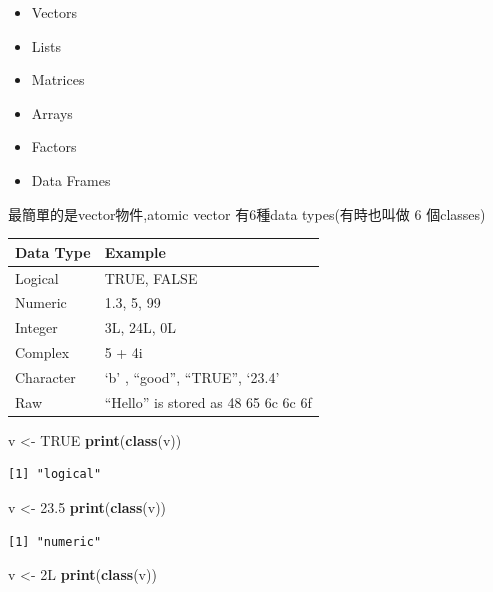 \documentclass[]{book}
\newenvironment{Shaded}{\begin{snugshade}}{\end{snugshade}}
\newcommand{\FloatTok}[1]{\textcolor[rgb]{0.00,0.00,0.81}{#1}}
\newcommand{\KeywordTok}[1]{\textcolor[rgb]{0.13,0.29,0.53}{\textbf{#1}}}
\newcommand{\NormalTok}[1]{#1}
\newcommand{\OtherTok}[1]{\textcolor[rgb]{0.56,0.35,0.01}{#1}}
\newcommand{\StringTok}[1]{\textcolor[rgb]{0.31,0.60,0.02}{#1}}
\providecommand{\tightlist}{%
  \setlength{\itemsep}{0pt}\setlength{\parskip}{0pt}}
\theoremstyle{definition}
\theoremstyle{definition}
\theoremstyle{definition}
\theoremstyle{remark}
\begin{document}
\begin{itemize}
\tightlist
\item
  Vectors\\
\item
  Lists\\
\item
  Matrices
\item
  Arrays
\item
  Factors
\item
  Data Frames
\end{itemize}

最簡單的是vector物件,atomic vector 有6種data types(有時也叫做 6
個classes)

\begin{longtable}[]{@{}ll@{}}
\toprule
Data Type & Example\tabularnewline
\midrule
\endhead
Logical & TRUE, FALSE\tabularnewline
Numeric & 1.3, 5, 99\tabularnewline
Integer & 3L, 24L, 0L\tabularnewline
Complex & 5 + 4i\tabularnewline
Character & `b' , ``good'', ``TRUE'', `23.4'\tabularnewline
Raw & ``Hello'' is stored as 48 65 6c 6c 6f\tabularnewline
\bottomrule
\end{longtable}

\begin{Shaded}
\begin{Highlighting}[]
\NormalTok{v <-}\StringTok{ }\OtherTok{TRUE} 
\KeywordTok{print}\NormalTok{(}\KeywordTok{class}\NormalTok{(v))}
\end{Highlighting}
\end{Shaded}

\begin{verbatim}
[1] "logical"
\end{verbatim}

\begin{Shaded}
\begin{Highlighting}[]
\NormalTok{v <-}\StringTok{ }\FloatTok{23.5}
\KeywordTok{print}\NormalTok{(}\KeywordTok{class}\NormalTok{(v))}
\end{Highlighting}
\end{Shaded}

\begin{verbatim}
[1] "numeric"
\end{verbatim}

\begin{Shaded}
\begin{Highlighting}[]
\NormalTok{v <-}\StringTok{ }\NormalTok{2L}
\KeywordTok{print}\NormalTok{(}\KeywordTok{class}\NormalTok{(v))}
\end{Highlighting}
\end{Shaded}
\end{document}
